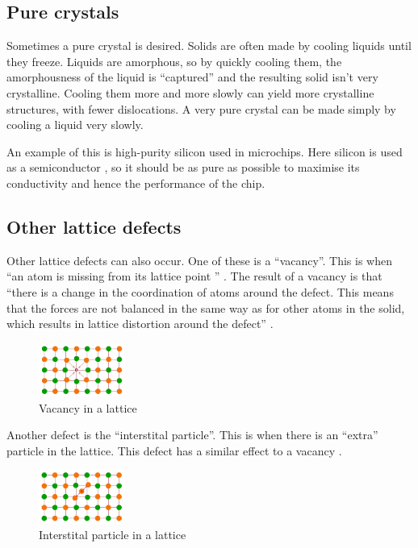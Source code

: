 \documentclass{article}
\begin{document}
    \subsection{Pure crystals}
    Sometimes a pure crystal is desired. Solids are often made by cooling
    liquids until they freeze. Liquids are amorphous, so by quickly cooling
    them, the amorphousness of the liquid is ``captured'' and the resulting
    solid isn't very crystalline. Cooling them more and more slowly can yield
    more crystalline structures, with fewer dislocations. A very pure crystal
    can be made simply by cooling a liquid very slowly.

    An example of this is high-purity silicon used in microchips. Here silicon
    is used as a semiconductor \cite{SOSilicon}, so it should be as pure as
    possible to maximise its conductivity and hence the performance of the
    chip.
    \subsection{Other lattice defects}
    Other lattice defects can also occur. One of these is a ``vacancy''. This
    is when ``an atom is missing from its lattice point ''
    \cite{LatticeDefects}.  The result of a vacancy is that ``there is a change
    in the coordination of atoms around the defect. This means that the forces
    are not balanced in the same way as for other atoms in the solid, which
    results in lattice distortion around the defect'' \cite{VirginiaDefects}.
    \begin{figure}[h]
        \includegraphics[width=0.25\textwidth]{vacancy}
        \centering
        \caption{Vacancy in a lattice}
    \end{figure}

    Another defect is the ``interstital particle''. This is when there is an
    ``extra'' particle in the lattice. This defect has a similar effect to a
    vacancy \cite{VirginiaDefects}.
    \begin{figure}[h]
        \includegraphics[width=0.25\textwidth]{interstital}
        \centering
        \caption{Interstital particle in a lattice}
    \end{figure}
\end{document}
